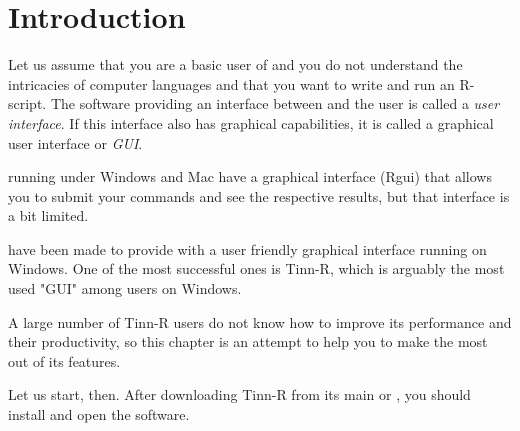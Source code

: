 
\section{Introduction}

Let us assume that you are a basic user of \RR{} and you do not understand the intricacies of computer
languages and that you want to write and run an R-script.
The software providing an interface between \RR{} and the user is called a \textit{user interface}.
If this interface also has graphical capabilities, it is called a graphical user interface or \textit{GUI}.

\RR{} running under Windows and Mac have a graphical interface (Rgui) that allows you to
submit your commands and see the respective results, but that interface is a bit limited.

\textit{} have been made to provide \RR{}
with a user friendly graphical interface running on Windows. One of the most successful ones is Tinn-R,
which is arguably the most used "GUI" among \RR{} users on Windows.

A large number of Tinn-R users do not know how to improve its performance and their productivity,
so this chapter is an attempt to help you to make the most out of its features.

Let us start, then. After downloading Tinn-R from its main
\textit{}
or
\textit{},
you should install and open the software.

